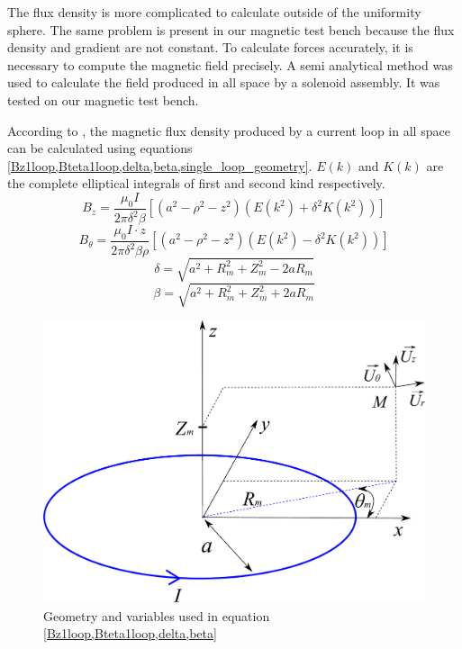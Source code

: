 \documentclass[letterpaper, 10 pt, conference]{ieeeconf}  %
\begin{document}
The flux density is more complicated to calculate outside of the uniformity sphere. The same problem is present in our magnetic test bench because the flux density and gradient are not constant. To calculate forces accurately, it is necessary to compute the magnetic field precisely. A semi analytical method was used to calculate the field produced in all space by a solenoid assembly. It was tested on our magnetic test bench.\par
According to \cite{simpson2001simple}, the magnetic flux density produced by a current loop in all space can be calculated using equations \cref{Bz1loop,Bteta1loop,delta,beta,single_loop_geometry}. $E(k)$ and $K(k)$ are the complete elliptical integrals of first and second kind respectively.
\begin{equation}
B_z=\frac{\mu _0I}{2\pi\delta ^{2}\beta  }\left [ \left ( a^2-\rho ^2-z^2 \right )(E(k^2)+\delta ^2K(k^2)) \right ] 
\label{Bz1loop}
\end{equation}
\begin{equation}
B_\theta=\frac{\mu _0 I \cdot z}{2\pi\delta ^{2}\beta\rho   }\left [ \left ( a^2-\rho ^2-z^2 \right )(E(k^2)-\delta ^2K(k^2)) \right ]
\label{Bteta1loop}
\end{equation}
\begin{equation}
\delta =\sqrt{a^2+R_m^2+Z_m^2-2aR_m}
\label{delta}
\end{equation}
\begin{equation}
\beta =\sqrt{a^2+R_m^2+Z_m^2+2aR_m}
\label{beta}
\end{equation}

\begin{figure}
  \includegraphics[width=\linewidth]{single_loop.pdf}
  \caption{Geometry and variables used in equation \cref{Bz1loop,Bteta1loop,delta,beta}}
  \label{single_loop_geometry}
\end{figure}
\end{document}
